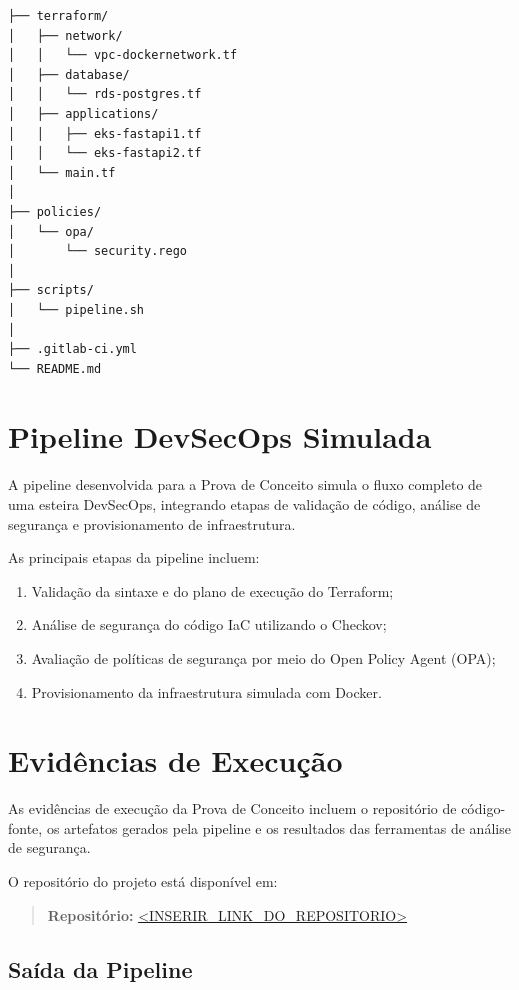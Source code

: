 \begin{verbatim}
├── terraform/
│   ├── network/
│   │   └── vpc-dockernetwork.tf
│   ├── database/
│   │   └── rds-postgres.tf
│   ├── applications/
│   │   ├── eks-fastapi1.tf
│   │   └── eks-fastapi2.tf
│   └── main.tf
│
├── policies/
│   └── opa/
│       └── security.rego
│
├── scripts/
│   └── pipeline.sh
│
├── .gitlab-ci.yml
└── README.md
\end{verbatim}

\section{Pipeline DevSecOps Simulada}

A pipeline desenvolvida para a Prova de Conceito simula o fluxo completo de uma esteira
DevSecOps, integrando etapas de validação de código, análise de segurança e
provisionamento de infraestrutura.

As principais etapas da pipeline incluem:

\begin{enumerate}
  \item Validação da sintaxe e do plano de execução do Terraform;
  \item Análise de segurança do código IaC utilizando o Checkov;
  \item Avaliação de políticas de segurança por meio do Open Policy Agent (OPA);
  \item Provisionamento da infraestrutura simulada com Docker.
\end{enumerate}

\section{Evidências de Execução}

As evidências de execução da Prova de Conceito incluem o repositório de código-fonte,
os artefatos gerados pela pipeline e os resultados das ferramentas de análise de
segurança.

O repositório do projeto está disponível em:

\begin{quote}
\textbf{Repositório:} \url{<INSERIR_LINK_DO_REPOSITORIO>}
\end{quote}

\subsection{Saída da Pipeline}


